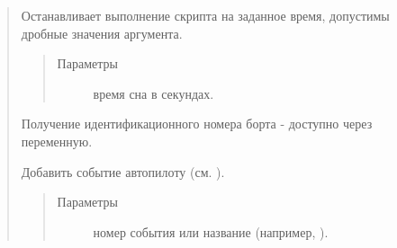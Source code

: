 \documentclass[a4paper,10pt,russian]{sphinxmanual}
\begin{document}
\begin{quote}

\begin{fulllineitems}
\label{\detokenize{programming/lua/lua:sleep}}
Останавливает выполнение скрипта на заданное время, допустимы дробные значения аргумента.
 {\hyperref[\detokenize{programming/lua/lua:Timer}]{}} 
\begin{quote}\begin{description}
\item[{Параметры}] \leavevmode
{} \textendash{} время сна в секундах.

\end{description}\end{quote}

\end{fulllineitems}


\begin{fulllineitems}
\label{\detokenize{programming/lua/lua:boardNumber}}
Получение идентификационного номера борта - доступно через переменную.

\end{fulllineitems}



%
\begin{sphinxVerbatim}[commandchars=\\\{\}]
   
\end{sphinxVerbatim}

\begin{fulllineitems}
\label{\detokenize{programming/lua/lua:ap.push}}
Добавить событие автопилоту (см. {\hyperref[\detokenize{programming/lua/lua:outluaevent}]{}}).
\begin{quote}\begin{description}
\item[{Параметры}] \leavevmode
{} \textendash{} номер события или название (например, ).


\end{description}
\end{quote}
\end{fulllineitems}
\end{quote}
\end{document}
